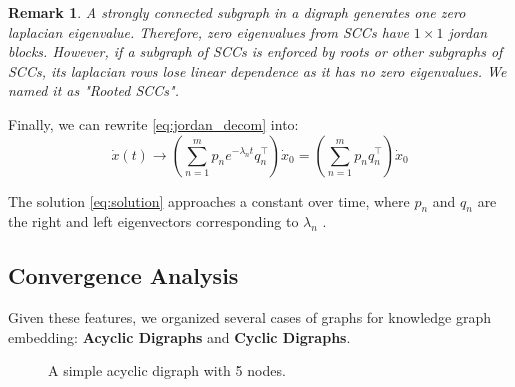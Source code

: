 \documentclass[letterpaper, 10 pt, conference]{ieeeconf}  %
\newtheorem{remark}{Remark}
\begin{document}
\begin{remark}
    A strongly connected subgraph in a digraph generates one zero laplacian eigenvalue. Therefore, zero eigenvalues from SCCs have \(1 \times 1\) jordan blocks. However, if a subgraph of SCCs is enforced by roots or other subgraphs of SCCs, its laplacian rows lose linear dependence as it has no zero eigenvalues. We named it as "Rooted SCCs". 
\end{remark}

Finally, we can rewrite \eqref{eq:jordan_decom} into:
\begin{equation}
    \dot{x}(t) \rightarrow \left( \sum_{n=1}^m p_n e^{-\lambda_n t} q_n^\top \right) \dot{x}_0 = \left( \sum_{n=1}^m p_n q_n^\top \right) \dot{x}_0
    \label{eq:solution}
\end{equation}

The solution \eqref{eq:solution} approaches a constant over time, where \( p_n \) and \( q_n \) are the right and left eigenvectors corresponding to \( \lambda_n \)  \cite{mesbahi_graph_2010}. 

\subsection{Convergence Analysis}

Given these features, we organized several cases of graphs for knowledge graph embedding: \textbf{Acyclic Digraphs} and \textbf{Cyclic Digraphs}.

\begin{figure}[h] %
    \centering
    \caption{A simple acyclic digraph with 5 nodes.}
    \label{fig:DAG}
    \end{figure}
\end{document}
